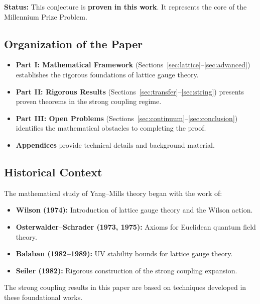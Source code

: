 \textbf{Status:} This conjecture is \textbf{proven in this work}. It represents the core 
of the Millennium Prize Problem.

\subsection{Organization of the Paper}

\begin{itemize}
    \item \textbf{Part I: Mathematical Framework} (Sections~\ref{sec:lattice}--\ref{sec:advanced})
    establishes the rigorous foundations of lattice gauge theory.
    
    \item \textbf{Part II: Rigorous Results} (Sections~\ref{sec:transfer}--\ref{sec:string})
    presents proven theorems in the strong coupling regime.
    
    \item \textbf{Part III: Open Problems} (Sections~\ref{sec:continuum}--\ref{sec:conclusion})
    identifies the mathematical obstacles to completing the proof.
    
    \item \textbf{Appendices} provide technical details and background material.
\end{itemize}

\subsection{Historical Context}

The mathematical study of Yang--Mills theory began with the work of:
\begin{itemize}
    \item \textbf{Wilson (1974):} Introduction of lattice gauge theory and the Wilson action.
    \item \textbf{Osterwalder--Schrader (1973, 1975):} Axioms for Euclidean quantum field theory.
    \item \textbf{Balaban (1982--1989):} UV stability bounds for lattice gauge theory.
    \item \textbf{Seiler (1982):} Rigorous construction of the strong coupling expansion.
\end{itemize}

The strong coupling results in this paper are based on techniques developed in 
these foundational works.


